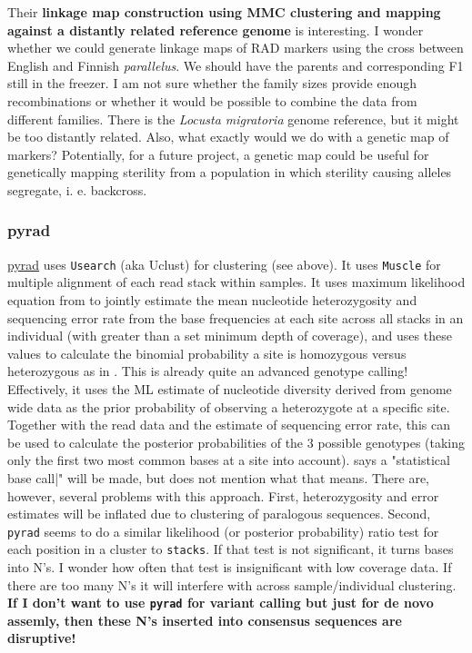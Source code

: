 \documentclass{article}\usepackage[]{graphicx}\usepackage[]{color}
\begin{document}
Their \textbf{linkage map construction using MMC clustering and mapping against a distantly related reference genome} is interesting. I wonder whether we could generate linkage maps of RAD markers using the cross between English and Finnish \textit{parallelus}. We should have the parents and corresponding F1 still in the freezer. I am not sure whether the family sizes provide enough recombinations or whether it would be possible to combine the data from different families. There is the \textit{Locusta migratoria} genome reference, but it might be too distantly related. Also, what exactly would we do with a genetic map of markers? Potentially, for a future project, a genetic map could be useful for genetically mapping sterility from a population in which sterility causing alleles segregate, i. e. backcross.

\subsubsection{pyrad}
\href{http://dereneaton.com/software/pyrad}{pyrad} \citep{Eaton2014} uses \texttt{Usearch} (aka Uclust) \citep{Edgar2010} for clustering (see above). It uses \texttt{Muscle} for multiple alignment of each read stack within samples. It uses maximum likelihood equation from \cite{Lynch2008} to jointly estimate the mean nucleotide heterozygosity and sequencing error rate from the base frequencies at each site across all stacks in an individual (with greater than a set minimum depth of coverage), and uses these values to calculate the binomial probability a site is homozygous versus heterozygous as in \cite{Li2008}. This is already quite an advanced genotype calling! Effectively, it uses the ML estimate of nucleotide diversity derived from genome wide data as the prior probability of observing a heterozygote at a specific site. Together with the read data and the estimate of sequencing error rate, this can be used to calculate the posterior probabilities of the 3 possible genotypes (taking only the first two most common bases at a site into account). \citep{Eaton2014} says a "statistical base call|" will be made, but does not mention what that means. There are, however, several problems with this approach. First, heterozygosity and error estimates will be inflated due to clustering of paralogous sequences. Second, \texttt{pyrad} seems to do a similar likelihood (or posterior probability) ratio test for each position in a cluster to \texttt{stacks}. If that test is not significant, it turns bases into N's. I wonder how often that test is insignificant with low coverage data. If there are too many N's it will interfere with across sample/individual clustering. \textbf{If I don't want to use \texttt{pyrad} for variant calling but just for de novo assemly, then these N's inserted into consensus sequences are disruptive!}
\end{document}
